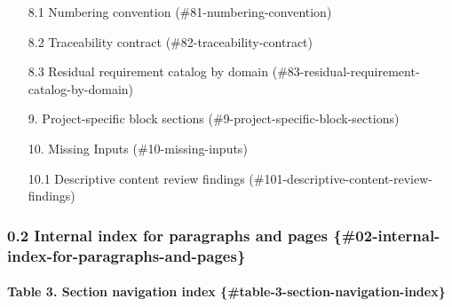 \documentclass[11pt]{article}
\begin{document}
\begin{itemize}
\item [8.1 Numbering convention](\#81-numbering-convention)
\item [8.2 Traceability contract](\#82-traceability-contract)
\item [8.3 Residual requirement catalog by domain](\#83-residual-requirement-catalog-by-domain)
\item [9. Project-specific block sections](\#9-project-specific-block-sections)
\item [10. Missing Inputs](\#10-missing-inputs)
\item [10.1 Descriptive content review findings](\#101-descriptive-content-review-findings)
\end{itemize}


\subsubsection{0.2 Internal index for paragraphs and pages \{\#02-internal-index-for-paragraphs-and-pages\}}


\paragraph{Table 3. Section navigation index \{\#table-3-section-navigation-index\}}
\end{document}
